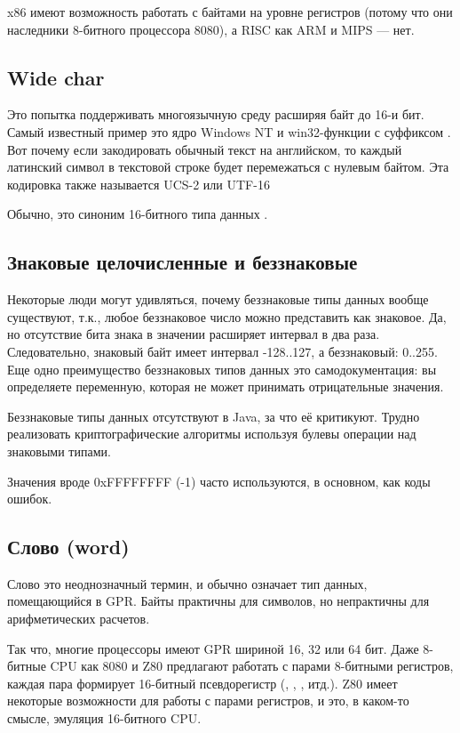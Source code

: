 x86 имеют возможность работать с байтами на уровне регистров (потому что они наследники 8-битного процессора 8080),
а RISC как ARM и MIPS --- нет.

\subsection{Wide char}

Это попытка поддерживать многоязычную среду расширяя байт до 16-и бит.
Самый известный пример это ядро Windows NT и win32-функции с суффиксом .
Вот почему если закодировать обычный текст на английском,
то каждый латинский символ в текстовой строке будет перемежаться с нулевым байтом.
Эта кодировка также называется UCS-2 или UTF-16

Обычно,  это синоним 16-битного типа данных .

\subsection{Знаковые целочисленные и беззнаковые}

Некоторые люди могут удивляться, почему беззнаковые типы данных вообще существуют, т.к., любое беззнаковое число
можно представить как знаковое.
Да, но отсутствие бита знака в значении расширяет интервал в два раза.
Следовательно, знаковый байт имеет интервал -128..127, а беззнаковый: 0..255.
Еще одно преимущество беззнаковых типов данных это самодокументация:
вы определяете переменную, которая не может принимать отрицательные значения.

Беззнаковые типы данных отсутствуют в Java, за что её критикуют.
Трудно реализовать криптографические алгоритмы используя булевы операции над знаковыми типами.

Значения вроде 0xFFFFFFFF (-1) часто используются, в основном, как коды ошибок.

\subsection{Слово (word)}

Слово  это неоднозначный термин, и обычно означает тип данных, помещающийся в \ac{GPR}.
Байты практичны для символов, но непрактичны для арифметических расчетов.

Так что, многие процессоры имеют \ac{GPR} шириной 16, 32 или 64 бит.
Даже 8-битные \ac{CPU} как 8080 и Z80 предлагают работать с парами 8-битными регистров, каждая пара формирует 16-битный
псевдорегистр
(, , , итд.).
Z80 имеет некоторые возможности для работы с парами регистров, и это, в каком-то смысле, эмуляция 16-битного CPU.

